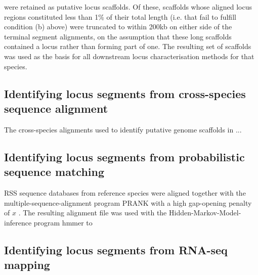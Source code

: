were retained as putative locus scaffolds. Of these, scaffolds whose aligned locus regions constituted less than 1\% of their total length (i.e. that fail to fulfill condition (b) above) were truncated to within 200kb on either side of the terminal segment alignments, on the assumption that these long scaffolds contained a locus rather than forming part of one. The resulting set of scaffolds was used as the basis for all downstream locus characterisation methods for that species.

\subsection{Identifying locus segments from cross-species sequence alignment}

The cross-species alignments used to identify putative genome scaffolds in ...

\subsection{Identifying locus segments from probabilistic sequence matching}

RSS sequence databases from reference species were aligned together with the multiple-sequence-alignment program PRANK %
with a high gap-opening penalty of $x$ %
. %
The resulting alignment file was used with the Hidden-Markov-Model-inference program hmmer to 

\subsection{Identifying locus segments from RNA-seq mapping}


